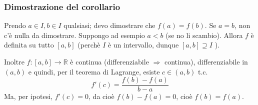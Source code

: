 \documentclass[a4paper]{article}
\theoremstyle{break}
\theoremstyle{break}
\theoremstyle{break}
\theoremstyle{break}
\begin{document}
\subsubsection{Dimostrazione del corollario}
Prendo \( a \in I, b \in I \) qualsiasi; devo dimostrare che \( f(a) = f(b) \).
Se \( a = b \), non c'è nulla da dimostrare. Suppongo ad esempio \( a < b \) (se no li scambio).
Allora \( f \) è definita su tutto \( [a,b] \) (perchè \( I \) è un intervallo, dunque \( [a,b] \supseteq I\) ).
\begin{figure}[H]
  \begin{center}
  \end{center}
\end{figure}
Inoltre \( f:[a,b] \to \mathbb{R} \) è continua (differenziabile \( \Rightarrow \) continua),
differenziabile in \( (a,b) \) e quindi, per il teorema di Lagrange, esiste \( c \in (a,b) \) t.c.
\[
f'(c)=\frac{f(b)-f(a)}{b-a}
\] 
Ma, per ipotesi, \( f'(c)=0 \), da cioè \( f(b)-f(a)=0 \), cioè \( f(b)=f(a) \).
\end{document}
